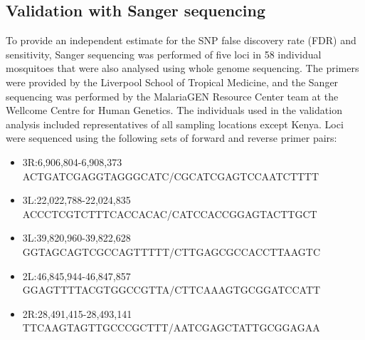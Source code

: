 \documentclass[a4paper,11pt,abstracton,hidelinks]{scrartcl}
\begin{document}
\subsection{Validation with Sanger sequencing}


To provide an independent estimate for the SNP false discovery rate (FDR) and sensitivity, Sanger sequencing was performed of five loci in 58 individual mosquitoes that were also analysed using whole genome sequencing.
%
The primers were provided by the Liverpool School of Tropical Medicine, and the Sanger sequencing was performed by the MalariaGEN Resource Center team at the Wellcome Centre for Human Genetics.
%
The individuals used in the validation analysis included representatives of all sampling locations except Kenya.
%
Loci were sequenced using the following sets of forward and reverse primer pairs: 
%
\begin{itemize}
\item 3R:6,906,804-6,908,373 \\ ACTGATCGAGGTAGGGCATC/CGCATCGAGTCCAATCTTTT
\item 3L:22,022,788-22,024,835 \\ ACCCTCGTCTTTCACCACAC/CATCCACCGGAGTACTTGCT
\item 3L:39,820,960-39,822,628 \\ GGTAGCAGTCGCCAGTTTTT/CTTGAGCGCCACCTTAAGTC
\item 2L:46,845,944-46,847,857 \\ GGAGTTTTACGTGGCCGTTA/CTTCAAAGTGCGGATCCATT 
\item 2R:28,491,415-28,493,141 \\ TTCAAGTAGTTGCCCGCTTT/AATCGAGCTATTGCGGAGAA
\end{itemize}
\end{document}
